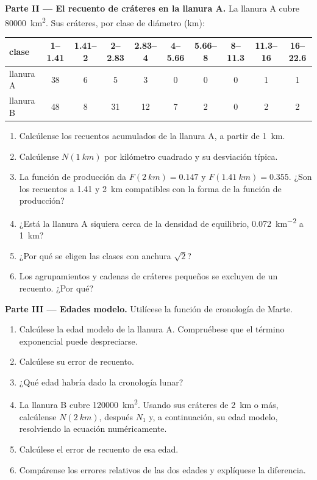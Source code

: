 \begin{problem}
\medskip\noindent\textbf{Parte II --- El recuento de cráteres en la llanura A.} La llanura A
cubre \qty{80000}{km^2}. Sus cráteres, por clase de diámetro (km):
\begin{center}
\small
\begin{tabular}{lccccccccc}
\hline
clase & 1--1.41 & 1.41--2 & 2--2.83 & 2.83--4 & 4--5.66 & 5.66--8 & 8--11.3 & 11.3--16 & 16--22.6 \\
\hline
llanura A & 38 & 6 & 5 & 3 & 0 & 0 & 0 & 1 & 1 \\
llanura B & 48 & 8 & 31 & 12 & 7 & 2 & 0 & 2 & 2 \\
\hline
\end{tabular}
\end{center}
\begin{enumerate}[resume]
\item Calcúlense los recuentos acumulados de la llanura A, a partir de \qty{1}{km}.
\item Calcúlense $N(\qty{1}{km})$ por kilómetro cuadrado y su desviación
  típica.
\item La función de producción da $F(\qty{2}{km}) = 0.147$ y
  $F(\qty{1.41}{km}) = 0.355$. ¿Son los recuentos a 1.41 y \qty{2}{km}
  compatibles con la forma de la función de producción?
\item ¿Está la llanura A siquiera cerca de la densidad de equilibrio,
  \qty{0.072}{km^{-2}} a \qty{1}{km}?
\item ¿Por qué se eligen las clases con anchura $\sqrt2$?
\item Los agrupamientos y cadenas de cráteres pequeños se excluyen de un recuento. ¿Por qué?
\end{enumerate}

\medskip\noindent\textbf{Parte III --- Edades modelo.} Utilícese la
  función de cronología de Marte.
\begin{enumerate}[resume]
\item Calcúlese la edad modelo de la llanura A.
  Compruébese que el término exponencial puede despreciarse.
\item Calcúlese su error de recuento.
\item ¿Qué edad habría dado la cronología lunar?
\item La llanura B cubre \qty{120000}{km^2}. Usando sus cráteres de \qty{2}{km}
  o más, calcúlense $N(\qty{2}{km})$, después $N_1$ y, a continuación, su edad modelo,
  resolviendo la ecuación numéricamente.
\item Calcúlese el error de recuento de esa edad.
\item Compárense los errores relativos de las dos edades y explíquese la
  diferencia.
\end{enumerate}


\end{problem}

